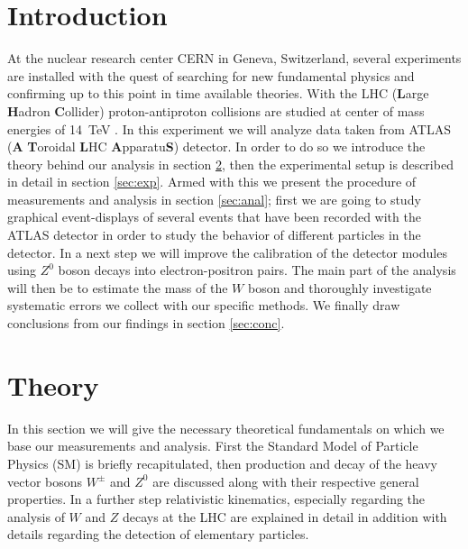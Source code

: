 \documentclass[11pt,a4paper,notitlepage]{scrartcl}
\begin{document}
\section{Introduction}
At the nuclear research center CERN in Geneva, Switzerland, several experiments are installed with the quest of searching for new fundamental physics and confirming up to this point in time available theories. With the LHC (\textbf{L}arge \textbf{H}adron \textbf{C}ollider) proton-antiproton collisions are studied at center of mass energies of \SI{14}{\tera\eV} \cite{manual}. In this experiment we will analyze data taken from ATLAS (\textbf{A} \textbf{T}oroidal \textbf{L}HC \textbf{A}pparatu\textbf{S}) detector. In order to do so we introduce the theory behind our analysis in section \ref{sec:theo}, then the experimental setup is described in detail in section \ref{sec:exp}. Armed with this we present the procedure of measurements and analysis in section \ref{sec:anal}; first we are going to study graphical event-displays of several events that have been recorded with the ATLAS detector in order to study the behavior of different particles in the detector. In a next step we will improve the calibration of the detector modules using $Z^0$ boson decays into electron-positron pairs. The main part of the analysis will then be to estimate the mass of the $W$ boson and thoroughly investigate systematic errors we collect with our specific methods. We finally draw conclusions from our findings in section \ref{sec:conc}.

\section{Theory}
\label{sec:theo}
In this section we will give the necessary theoretical fundamentals on which we  base our measurements and analysis. First the Standard Model of Particle Physics (SM) is briefly recapitulated, then production and decay of the heavy vector bosons $W^{\pm}$ and $Z^0$ are discussed along with their respective general properties. In a further step relativistic kinematics, especially regarding the analysis of $W$ and $Z$ decays at the LHC are explained in detail in addition with details regarding the detection of elementary particles.
\end{document}

